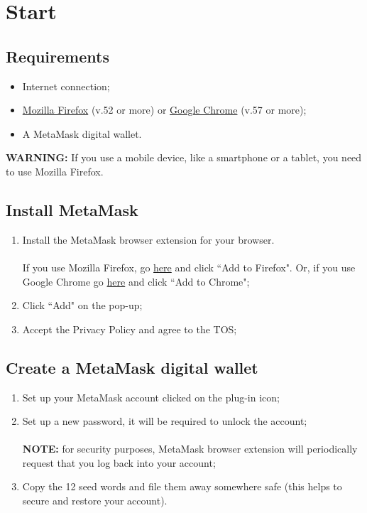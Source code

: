 \documentclass[ManualeUtente.tex]{subfiles}
\begin{document}
\chapter{Start}

\section{Requirements}
\begin{itemize}
	\item Internet connection;
	\item \href{https://www.mozilla.org/en-US/firefox/new/}{Mozilla Firefox} (v.52 or more) or	
	\href{https://www.google.com/intl/en/chrome/}{Google Chrome} (v.57 or more);
	\item A MetaMask digital wallet.
\end{itemize}

\textbf{WARNING:} If you use a mobile device, like a smartphone or a tablet, you need to use Mozilla Firefox.

\section{Install MetaMask}
\begin{enumerate}
	\item Install the MetaMask browser extension for your browser.\\\\
	If you use Mozilla Firefox, go
	\href{https://addons.mozilla.org/en-US/firefox/addon/ether-metamask/}{here}
	and click \textquotedblleft Add to Firefox". Or, if you use Google Chrome go \href{https://chrome.google.com/webstore/detail/metamask/nkbihfbeogaeaoehlefnkodbefgpgknn}{here} and click \textquotedblleft Add to Chrome";
	\item Click \textquotedblleft Add" on the pop-up;
	\item Accept the Privacy Policy and agree to the TOS;
\end{enumerate}

\section{Create a MetaMask digital wallet}
\begin{enumerate}	
	\item Set up your MetaMask account clicked on the plug-in icon;
	\item Set up a new password, it will be required to unlock the account;\\\\
	\textbf{NOTE:} for security purposes, MetaMask browser extension will periodically request that you log back into your account;
	\item Copy the 12 seed words and file them away somewhere safe (this helps to secure and restore your account).
\end{enumerate}
\end{document}
